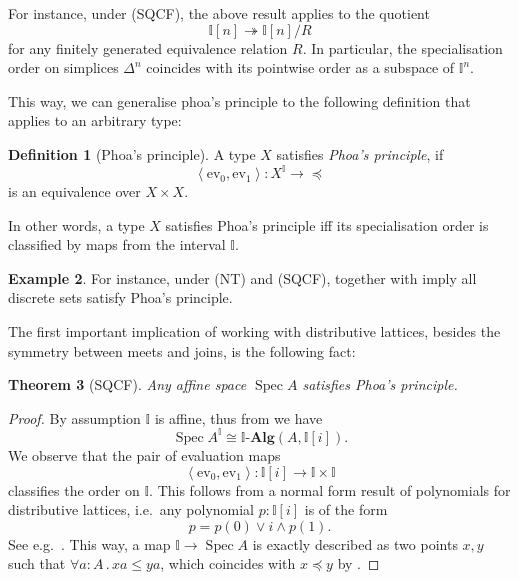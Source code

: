 \documentclass[12pt]{amsart}
\newtheorem{theorem}{Theorem}[section]
\theoremstyle{definition}
\newtheorem{example}[theorem]{Example}
\newtheorem{definition}[theorem]{Definition}
\newtheorem{remark}[theorem]{Remark}
\newcommand{\mb}[1]{\mathbf{#1}}
\newcommand{\mbb}[1]{\mathbb{#1}}
\newcommand{\I}{\mbb I}
\newcommand{\alg}{\text{-}\mb{Alg}}
\newcommand{\pair}[1]{\left\langle#1\right\rangle}
\newcommand{\ev}{\mathrm{ev}}
\newcommand{\surj}{\twoheadrightarrow}
\newcommand{\fa}[2]{\forall #1\!\colon\!\!#2\mathpunct{.}}
\newcommand{\spec}{\operatorname{Spec}}
\begin{document}
For instance, under (SQCF), the above result applies to the quotient 
\[ \I[n] \surj \I[n]/R \]
for any finitely generated equivalence relation $R$. In particular, the specialisation order on simplices $\Delta^n$ coincides with its pointwise order as a subspace of $\I^n$.

This way, we can generalise phoa's principle to the following definition that applies to an arbitrary type:

\begin{definition}[Phoa's principle]\label{def:phoa}
  A type $X$ satisfies \emph{Phoa's principle}, if 
  \[ \pair{\ev_0,\ev_1} : X^\I \to \operatorname{\preceq} \]
  is an equivalence over $X \times X$.
\end{definition}


In other words, a type $X$ satisfies Phoa's principle iff its specialisation order is classified by maps from the interval $\I$.

\begin{example}
  For instance, under (NT) and (SQCF),  together with  imply all discrete sets satisfy Phoa's principle.
\end{example}

The first important implication of working with distributive lattices, besides the symmetry between meets and joins, is the following fact:

\begin{theorem}[SQCF]\label{thm:phoaaffine}
  Any affine space $\spec A$ satisfies Phoa's principle.
\end{theorem}
\begin{proof}
  By assumption $\I$ is affine, thus from  we have
  \[ \spec A^\I \cong \I\alg(A,\I[i]). \]
  We observe that the pair of evaluation maps
  \[ \pair{\ev_0,\ev_1} : \I[i] \to \I \times \I \]
  classifies the order on $\I$. This follows from a normal form result of polynomials for distributive lattices, i.e.\ any polynomial $p:\I[i]$ is of the form 
  \[ p = p(0) \vee i \wedge p(1). \]
  See e.g.~\cite[Thm. 10.11]{lausch2000algebra}. This way, a map $\I \to \spec A$ is exactly described as two points $x,y$ such that $\fa aA xa \le ya$, which coincides with $x \preceq y$ by .
\end{proof}
\end{document}
